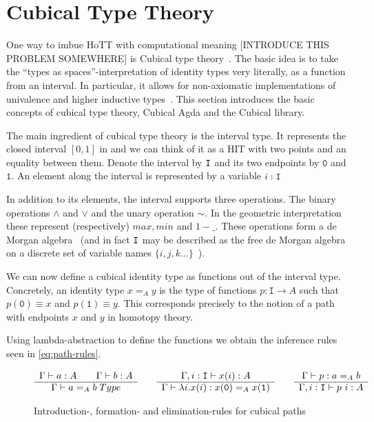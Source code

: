 \section{Cubical Type Theory}

One way to imbue HoTT with computational meaning [INTRODUCE THIS PROBLEM
SOMEWHERE] is Cubical type theory~\cite{cohen2016cubical}. The basic idea is to
take the ``types as spaces''-interpretation of identity types very literally, as
a function from an interval. In particular, it allows for non-axiomatic
implementations of univalence and higher inductive types~\cite{coquand2018higher}. This section
introduces the basic concepts of cubical type theory, Cubical Agda and the
Cubical library.

The main ingredient of cubical type theory is the interval type. It represents
the closed interval $[0,1]$ in and we can think of it as a HIT with two points
and an equality between them. Denote the interval by $\texttt{I}$ and its two
endpoints by $\texttt{0}$ and $\texttt{1}$. An element along the interval is
represented by a variable $i : \texttt{I}$

In addition to its elements, the interval supports three operations. The binary
operations $\land$ and $\lor$ and the unary operation $\sim$. In the geometric
interpretation these represent (respectively) $max, min$ and $1 - \_$. These
operations form a de Morgan algebra~\cite{mortberg2020cubical} (and in fact
$\texttt{I}$ may be described as the free de Morgan algebra on a discrete set of
variable names $\{i, j, k ...\}$~\cite{cohen2016cubical}).

We can now define a cubical identity type as functions out of the interval type.
Concretely, an identity type $x =_A y$ is the type of functions $p : \texttt{I}
\rightarrow A$ such that $p(\texttt{0}) \equiv x$ and $p(\texttt{1}) \equiv y$.
This corresponds precisely to the notion of a path with endpoints $x$ and $y$ in
homotopy theory.

Using lambda-abstraction to define the functions we obtain the inference rules
seen in \autoref{eq:path-rules}.

\begin{figure}
\begin{equation*}
  \begin{array}[t]{c}
    \Gamma \vdash a : A \qquad \Gamma \vdash b : A\\
    \hline
    \Gamma \vdash a =_A b \; Type\\
  \end{array}
  \qquad
  \begin{array}[t]{c}
    \Gamma, i : \texttt{I} \vdash x(i) : A\\
    \hline
    \Gamma \vdash \lambda i.x(i) : x(\texttt{0}) =_A x(\texttt{1})\\
  \end{array}
  \qquad
  \begin{array}[t]{c}
    \Gamma \vdash p : a =_A b\\
    \hline
    \Gamma, i : \texttt{I} \vdash p~i : A
  \end{array}
\end{equation*}
  \caption{Introduction-, formation- and elimination-rules for cubical paths}
  \label{eq:path-rules}
\end{figure}

